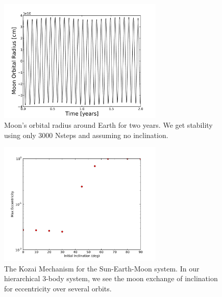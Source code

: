 \documentclass[11pt,letterpaper]{article}
\begin{document}
\begin{figure}[bth]
\centering
\includegraphics[width=0.7\textwidth]{moonorb.pdf}
\caption{Moon's orbital radius around Earth for two years. We get stability using only 3000 Nsteps and assuming no inclination.}
\label{fig:7}
\end{figure}

\begin{figure}[bth]
\centering
\includegraphics[width=0.7\textwidth]{ecc1.pdf}
\caption{The Kozai Mechanism for the Sun-Earth-Moon system. In our hierarchical 3-body system, we see the moon exchange of inclination for eccentricity over several orbits.}
\label{fig:8}
\end{figure}
\end{document}
